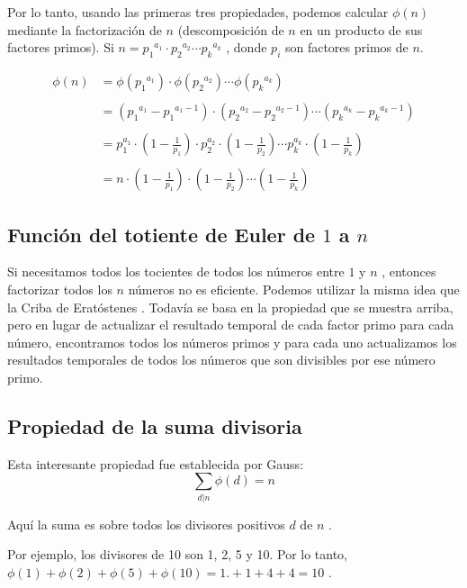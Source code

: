 Por lo tanto, usando las primeras tres propiedades, podemos calcular $\phi(n)$ mediante la factorización de $n$ (descomposición de $n$ en un producto de sus factores primos). Si $n = {p_1}^{a_1} \cdot {p_2}^{a_2} \cdots {p_k}^{a_k}$ , donde $p_i$ son factores primos de $n$.


\begin{align}
	\phi (n) &= \phi ({p_1}^{a_1}) \cdot \phi ({p_2}^{a_2}) \cdots  \phi ({p_k}^{a_k}) \\\\
	&= \left({p_1}^{a_1} - {p_1}^{a_1 - 1}\right) \cdot \left({p_2}^{a_2} - {p_2}^{a_2 - 1}\right) \cdots \left({p_k}^{a_k} - {p_k}^{a_k - 1}\right) \\\\
	&= p_1^{a_1} \cdot \left(1 - \frac{1}{p_1}\right) \cdot p_2^{a_2} \cdot \left(1 - \frac{1}{p_2}\right) \cdots p_k^{a_k} \cdot \left(1 - \frac{1}{p_k}\right) \\\\
	&= n \cdot \left(1 - \frac{1}{p_1}\right) \cdot \left(1 - \frac{1}{p_2}\right) \cdots \left(1 - \frac{1}{p_k}\right)
\end{align}


\subsection{Función del totiente de Euler de $1$ a $n$}

Si necesitamos todos los tocientes de todos los números entre $1$ y $n$ , entonces factorizar todos los $n$ números no es eficiente. Podemos utilizar la misma idea que la Criba de Eratóstenes . Todavía se basa en la propiedad que se muestra arriba, pero en lugar de actualizar el resultado temporal de cada factor primo para cada número, encontramos todos los números primos y para cada uno actualizamos los resultados temporales de todos los números que son divisibles por ese número primo.


\subsection{Propiedad de la suma divisoria}

Esta interesante propiedad fue establecida por Gauss:
$$ \sum_{d|n} \phi{(d)} = n$$

Aquí la suma es sobre todos los divisores positivos $d$ de $n$ .

Por ejemplo, los divisores de 10 son 1, 2, 5 y 10. Por lo tanto, $\phi{(1)} + \phi{(2)} + \phi{(5)} + \phi{(10)} = 1. + 1 + 4 + 4 = 10$ .


